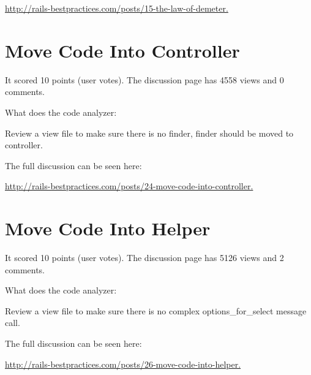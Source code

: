 \url{http://rails-bestpractices.com/posts/15-the-law-of-demeter.}

\section{Move Code Into Controller}


It scored 10 points (user votes). 
The discussion page has 4558 views and 0 comments.

What does the code analyzer:

Review a view file to make sure there is no finder, finder should be moved to controller.

The full discussion can be seen here:

\url{http://rails-bestpractices.com/posts/24-move-code-into-controller.}

   
\section{Move Code Into Helper }


It scored 10 points (user votes). 
The discussion page has 5126 views and 2 comments.

What does the code analyzer:

Review a view file to make sure there is no complex options\_for\_select message call.

The full discussion can be seen here:
 
\url{http://rails-bestpractices.com/posts/26-move-code-into-helper.}

